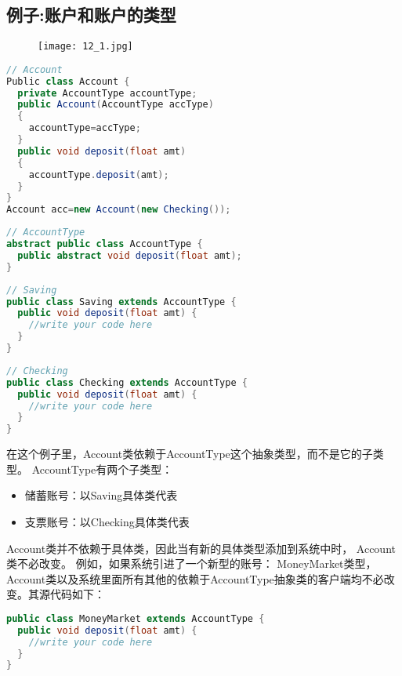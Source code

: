 \documentclass[../main.tex]{subfiles}
\begin{document}
\subsection{例子:账户和账户的类型}
\begin{figure}[H]
  \texttt{[image: 12\_1.jpg]}
\end{figure}
\begin{lstlisting}[language=java]
// Account
Public class Account {
  private AccountType accountType;
  public Account(AccountType accType)
  {
    accountType=accType;
  }
  public void deposit(float amt)
  {
    accountType.deposit(amt);
  }
}
Account acc=new Account(new Checking());
\end{lstlisting}
\begin{lstlisting}[language=java]
// AccountType
abstract public class AccountType {
  public abstract void deposit(float amt);
}
\end{lstlisting}
\begin{lstlisting}[language=java]
// Saving
public class Saving extends AccountType {
  public void deposit(float amt) {
    //write your code here
  }
}
\end{lstlisting}
\begin{lstlisting}[language=java]
// Checking
public class Checking extends AccountType {
  public void deposit(float amt) {
    //write your code here
  }
}
\end{lstlisting}
在这个例子里，Account类依赖于AccountType这个抽象类型，而不是它的子类型。
AccountType有两个子类型：
\begin{itemize}
  \item 储蓄账号：以Saving具体类代表
  \item 支票账号：以Checking具体类代表
\end{itemize}
Account类并不依赖于具体类，因此当有新的具体类型添加到系统中时， Account类不必改变。
例如，如果系统引进了一个新型的账号：
MoneyMarket类型， Account类以及系统里面所有其他的依赖于AccountType抽象类的客户端均不必改变。其源代码如下：
\begin{lstlisting}[language=java]
public class MoneyMarket extends AccountType {
  public void deposit(float amt) {
    //write your code here
  }
}
\end{lstlisting}
\end{document}
